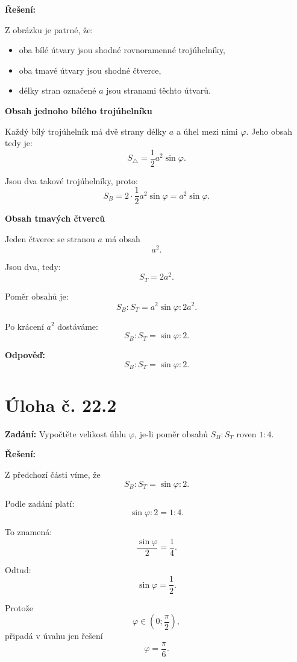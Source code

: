 \documentclass[12pt,a4paper]{article}
\begin{document}
\textbf{Řešení:}

Z obrázku je patrné, že:
\begin{itemize}
    \item oba bílé útvary jsou shodné rovnoramenné trojúhelníky,
    \item oba tmavé útvary jsou shodné čtverce,
    \item délky stran označené \(a\) jsou stranami těchto útvarů.
\end{itemize}

\medskip

\textbf{Obsah jednoho bílého trojúhelníku}

Každý bílý trojúhelník má dvě strany délky \(a\) a úhel mezi nimi \(\varphi\).  
Jeho obsah tedy je:
\[
S_{\triangle}=\frac12 a^2 \sin\varphi.
\]

Jsou dva takové trojúhelníky, proto:
\[
S_B=2\cdot \frac12 a^2\sin\varphi=a^2\sin\varphi.
\]

\medskip

\textbf{Obsah tmavých čtverců}

Jeden čtverec se stranou \(a\) má obsah
\[
a^2.
\]

Jsou dva, tedy:
\[
S_T=2a^2.
\]

\medskip

Poměr obsahů je:
\[
S_B:S_T = a^2\sin\varphi : 2a^2.
\]

Po krácení \(a^2\) dostáváme:
\[
S_B:S_T = \sin\varphi : 2.
\]

\bigskip

\textbf{Odpověď:}  
\[
S_B:S_T=\sin\varphi:2.
\]


\section*{Úloha č. 22.2}

\textbf{Zadání:}  
Vypočtěte velikost úhlu \(\varphi\), je-li poměr obsahů \(S_B:S_T\) roven \(1:4\).

\bigskip

\textbf{Řešení:}

Z předchozí části víme, že
\[
S_B:S_T=\sin\varphi:2.
\]

Podle zadání platí:
\[
\sin\varphi:2 = 1:4.
\]

To znamená:
\[
\frac{\sin\varphi}{2}=\frac14.
\]

Odtud:
\[
\sin\varphi=\frac12.
\]

Protože
\[
\varphi \in \left(0;\frac{\pi}{2}\right),
\]
připadá v úvahu jen řešení
\[
\varphi=\frac{\pi}{6}.
\]
\end{document}
